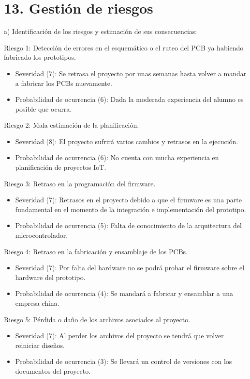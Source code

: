 \documentclass[
11pt, %
codirector, %
]{charter}
\begin{document}
\section{13. Gestión de riesgos}
\label{sec:riesgos}
a) Identificación de los riesgos y estimación de sus consecuencias:

Riesgo 1: Detección de errores en el esquemático o el ruteo del PCB ya habiendo fabricado los prototipos.
\begin{itemize}
	\item Severidad (7): Se retrasa el proyecto por unas semanas hasta volver a mandar a fabricar los PCBs nuevamente.
	\item Probabilidad de ocurrencia (6): Dada la moderada experiencia del alumno es posible que ocurra.
\end{itemize}  

Riesgo 2: Mala estimación de la planificación.
\begin{itemize}
	\item Severidad (8): El proyecto sufrirá varios cambios y retrasos en la ejecución.
	\item Probabilidad de ocurrencia (6): No cuenta con mucha experiencia en planificación de proyectos IoT.
\end{itemize}

Riesgo 3: Retraso en la programación del firmware.
\begin{itemize}
	\item Severidad (7): Retrasos en el proyecto debido a que el firmware es una parte fundamental en el momento de la integración e implementación del prototipo.
	\item Probabilidad de ocurrencia (5): Falta de conocimiento de la arquitectura del microcontrolador.
\end{itemize}  

Riesgo 4: Retraso en la fabricación y ensamblaje de los PCBs.
\begin{itemize}
	\item Severidad (7): Por falta del hardware no se podrá probar el firmware sobre el hardware del prototipo.
	\item Probabilidad de ocurrencia (4): Se mandará a fabricar y ensamblar a una empresa china. 
\end{itemize}

Riesgo 5: Pérdida o daño de los archivos asociados al proyecto.
\begin{itemize}
	\item Severidad (7): Al perder los archivos del proyecto se tendrá que volver reiniciar diseños.
	\item Probabilidad de ocurrencia (3): Se llevará un control de versiones con los documentos del proyecto.
\end{itemize}  
\end{document}
